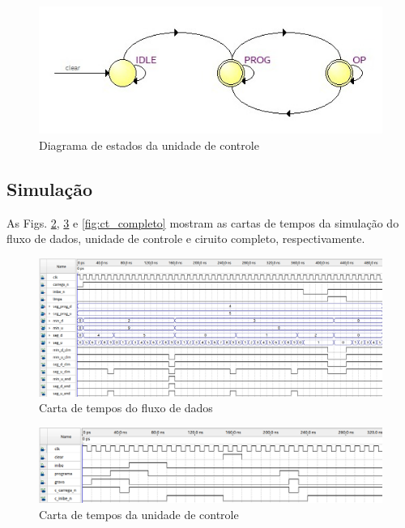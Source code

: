 \documentclass[a4,12pt]{horizon-theme}
\begin{document}
\begin{figure}[!ht]
    \centering
    \includegraphics[width=\textwidth]{diagrama_estados.jpeg}
    \caption{Diagrama de estados da unidade de controle}
    \label{fig:estados}
\end{figure}

\newpage
\subsection{Simulação}

As Figs. \ref{fig:ct_fd}, \ref{fig:ct_uc} e \ref{fig:ct_completo} mostram as cartas de tempos da simulação do fluxo de dados, unidade de controle e ciruito completo, respectivamente.

\begin{figure}[!ht]
    \centering
    \includegraphics[width=\textwidth]{p2_fd.png}
    \caption{Carta de tempos do fluxo de dados}
    \label{fig:ct_fd}
\end{figure}

\begin{figure}[!ht]
    \centering
    \includegraphics[width=\textwidth]{p2_uc.png}
    \caption{Carta de tempos da unidade de controle}
    \label{fig:ct_uc}
\end{figure}
\end{document}
